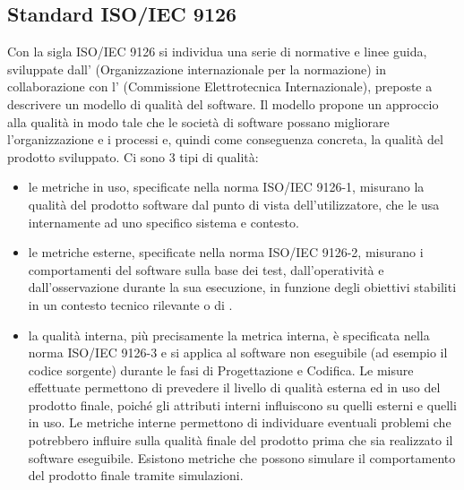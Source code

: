 
\subsection{Standard ISO/IEC 9126} %

Con la sigla ISO/IEC 9126 si individua una serie di normative e linee guida, sviluppate dall' (Organizzazione internazionale per la normazione) in collaborazione con l' (Commissione Elettrotecnica Internazionale), preposte a descrivere un modello di qualità del software. Il modello propone un approccio alla qualità in modo tale che le società di software possano migliorare l'organizzazione e i processi e, quindi come conseguenza concreta, la qualità del prodotto sviluppato. Ci sono 3 tipi di qualità:
\begin{itemize}
\item {} le metriche in uso, specificate nella norma ISO/IEC 9126-1, misurano la qualità del prodotto software dal punto di vista dell'utilizzatore, che le usa internamente ad uno specifico sistema e contesto.
\end{itemize}
\begin{itemize}
\item {} le metriche esterne, specificate nella norma ISO/IEC 9126-2, misurano i comportamenti del software sulla base dei test, dall'operatività e dall'osservazione durante la sua esecuzione, in funzione degli obiettivi stabiliti in un contesto tecnico rilevante o di .
\end{itemize}
\begin{itemize}
\item {} la qualità interna, più precisamente la metrica interna, è specificata nella norma ISO/IEC 9126-3 e si applica al software non eseguibile (ad esempio il codice sorgente) durante le fasi di Progettazione e Codifica. Le misure effettuate permettono di prevedere il livello di qualità esterna ed in uso del prodotto finale, poiché gli attributi interni influiscono su quelli esterni e quelli in uso. Le metriche interne permettono di individuare eventuali problemi che potrebbero influire sulla qualità finale del prodotto prima che sia realizzato il software eseguibile. Esistono metriche che possono simulare il comportamento del prodotto finale tramite simulazioni.
\end{itemize}


